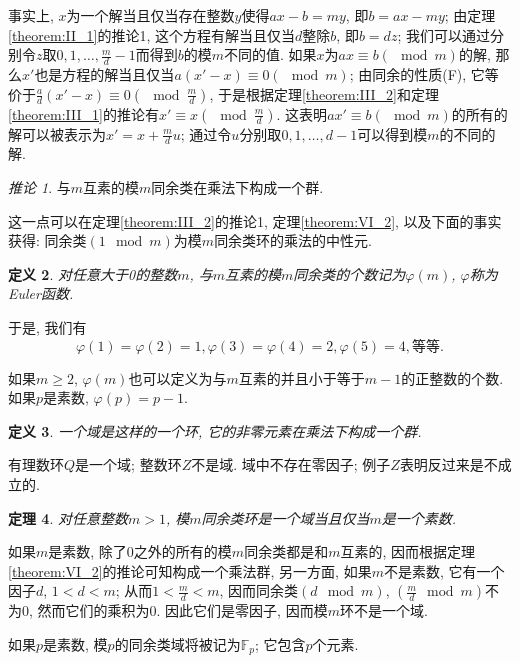 \documentclass[12pt,a4paper]{book} %
\newtheorem{theorem}{定理}
\newtheorem{definition}[theorem]{定义}
\theoremstyle{remark}
\theoremstyle{example}
\theoremstyle{lemma}
\theoremstyle{corollary}
\newtheorem{corollary}[theorem]{推论}
\numberwithin{theorem}{chapter}
\begin{document}
事实上, $x$为一个解当且仅当存在整数$y$使得$ax - b = my$, 即$b = ax - my$; 由定理\ref{theorem:II_1}的推论1, 这个方程有解当且仅当$d$整除$b$, 即$b = dz$; 我们可以通过分别令$z$取$0, 1, \ldots, \frac{m}{d} - 1$而得到$b$的模$m$不同的值. 如果$x$为$ax \equiv b(\mod m)$的解, 那么$x'$也是方程的解当且仅当$a(x' - x) \equiv 0 (\mod m)$; 由同余的性质(F), 它等价于$\frac{a}{d}(x' - x) \equiv 0 (\mod \frac{m}{d})$, 于是根据定理\ref{theorem:III_2}和定理\ref{theorem:III_1}的推论有$x' \equiv x (\mod \frac{m}{d})$.  这表明$ax' \equiv b (\mod m)$的所有的解可以被表示为$x' = x + \frac{m}{d}u$; 通过令$u$分别取$0, 1, \ldots, d - 1$可以得到模$m$的不同的解.

\begin{corollary}
与$m$互素的模$m$同余类在乘法下构成一个群.
\end{corollary}

这一点可以在定理\ref{theorem:III_2}的推论1, 定理\ref{theorem:VI_2}, 以及下面的事实获得: 同余类$(1 \mod m)$为模$m$同余类环的乘法的中性元.

\begin{definition}
对任意大于0的整数$m$, 与$m$互素的模$m$同余类的个数记为$\varphi(m)$, $\varphi$称为Euler函数.
\end{definition}

于是, 我们有
\[
\varphi(1) = \varphi(2) = 1, \varphi(3) = \varphi(4) = 2, \varphi(5) = 4, \text{等等}.
\]

如果$m \ge 2$, $\varphi(m)$也可以定义为与$m$互素的并且小于等于$m - 1$的正整数的个数. 如果$p$是素数, $\varphi(p) = p - 1$.

\begin{definition}
一个\emph{域}是这样的一个环, 它的非零元素在乘法下构成一个群.
\end{definition}

有理数环$Q$是一个域; 整数环$Z$不是域. 域中不存在零因子; 例子$Z$表明反过来是不成立的.

\begin{theorem}
对任意整数$m > 1$, 模$m$同余类环是一个域当且仅当$m$是一个素数.
\end{theorem}

如果$m$是素数, 除了$0$之外的所有的模$m$同余类都是和$m$互素的, 因而根据定理\ref{theorem:VI_2}的推论可知构成一个乘法群, 另一方面, 如果$m$不是素数, 它有一个因子$d$, $1 < d < m$; 从而$1 < \frac{m}{d} < m$, 因而同余类$(d \mod m)$, $(\frac{m}{d} \mod m)$不为0, 然而它们的乘积为0. 因此它们是零因子, 因而模$m$环不是一个域.

如果$p$是素数, 模$p$的同余类域将被记为$\mathbb{F}_p$; 它包含$p$个元素.
\end{document}
